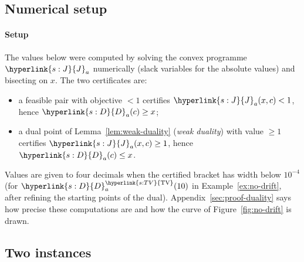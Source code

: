 \documentclass[11pt]{article}
\newcommand{\sy}[2]{{\hyperlink{#1}{#2}}}
\newcommand{\TV}{\sy{s:TV}{\mathrm{TV}}}
\newcommand{\Jf}{\sy{s:J}{J}}
\newcommand{\Dc}{\sy{s:D}{D}}
\begin{document}
\subsection{Numerical setup}\label{sec:numerics}

\paragraph{Setup} The values below were computed by solving the convex programme $\Jf_a$ numerically
(slack variables for the absolute values) and bisecting on $x$. The two certificates are:
\begin{itemize}
\item a feasible pair with objective $<1$ certifies $\Jf_a(x,c)<1$, hence $\Dc_a(c)\ge x$;
\item a dual point of Lemma~\ref{lem:weak-duality} (\emph{weak duality}) with value $\ge1$
  certifies $\Jf_a(x,c)\ge1$, hence $\Dc_a(c)\le x$.
\end{itemize}
Values are given to four decimals when the certified bracket has width below $10^{-4}$ (for
$\Dc^{\TV}_a(10)$ in Example~\ref{ex:no-drift}, after refining the starting points of the dual).
Appendix~\ref{sec:proof-duality} says how precise these computations are and how the curve of
Figure~\ref{fig:no-drift} is drawn.

\subsection{Two instances}
\end{document}
